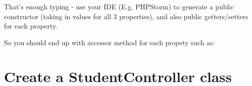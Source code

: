 \documentclass[a4paperpaper,openright]{book}
\newenvironment{Shaded}{}{}
\newcommand{\AnnotationTok}[1]{\textcolor[rgb]{0.38,0.63,0.69}{\textbf{\textit{#1}}}}
\newcommand{\CommentTok}[1]{\textcolor[rgb]{0.38,0.63,0.69}{\textit{#1}}}
\newcommand{\CommentVarTok}[1]{\textcolor[rgb]{0.38,0.63,0.69}{\textbf{\textit{#1}}}}
\newcommand{\KeywordTok}[1]{\textcolor[rgb]{0.00,0.44,0.13}{\textbf{#1}}}
\newcommand{\NormalTok}[1]{#1}
\newcommand{\OtherTok}[1]{\textcolor[rgb]{0.00,0.44,0.13}{#1}}
\newcommand{\StringTok}[1]{\textcolor[rgb]{0.25,0.44,0.63}{#1}}
\begin{document}
\begin{Shaded}
\end{Shaded}

That's enough typing - use your IDE (E.g. PHPStorm) to generate a public
constructor (taking in values for all 3 properties), and also public
getters/setters for each property.

So you should end up with accessor method for each propety such as:

\begin{Shaded}
\end{Shaded}

\hypertarget{create-a-studentcontroller-class}{%
\section{Create a StudentController
class}\label{create-a-studentcontroller-class}}
\end{document}

